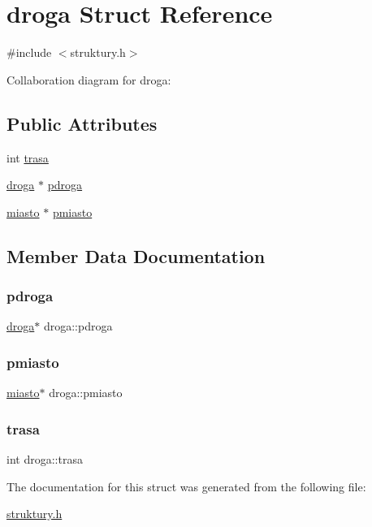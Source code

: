 \hypertarget{structdroga}{}\section{droga Struct Reference}
\label{structdroga}


{\ttfamily \#include $<$struktury.\+h$>$}



Collaboration diagram for droga\+:
\subsection*{Public Attributes}
\begin{DoxyCompactItemize}
\item 
int \mbox{\hyperlink{structdroga_a4788083344d3da2783792f80b35ab524}{trasa}}
\item 
\mbox{\hyperlink{structdroga}{droga}} $\ast$ \mbox{\hyperlink{structdroga_a7ed57ce3de3b4184ba7f7c805964626f}{pdroga}}
\item 
\mbox{\hyperlink{structmiasto}{miasto}} $\ast$ \mbox{\hyperlink{structdroga_a9c782b9f5281ee0f4cb4581a364b4471}{pmiasto}}
\end{DoxyCompactItemize}


\subsection{Member Data Documentation}
\mbox{\label{structdroga_a7ed57ce3de3b4184ba7f7c805964626f}} 
\subsubsection{\texorpdfstring{pdroga}{pdroga}}
{\footnotesize\ttfamily \mbox{\hyperlink{structdroga}{droga}}$\ast$ droga\+::pdroga}

\mbox{\label{structdroga_a9c782b9f5281ee0f4cb4581a364b4471}} 
\subsubsection{\texorpdfstring{pmiasto}{pmiasto}}
{\footnotesize\ttfamily \mbox{\hyperlink{structmiasto}{miasto}}$\ast$ droga\+::pmiasto}

\mbox{\label{structdroga_a4788083344d3da2783792f80b35ab524}} 
\subsubsection{\texorpdfstring{trasa}{trasa}}
{\footnotesize\ttfamily int droga\+::trasa}



The documentation for this struct was generated from the following file\+:\begin{DoxyCompactItemize}
\item 
\mbox{\hyperlink{struktury_8h}{struktury.\+h}}\end{DoxyCompactItemize}

